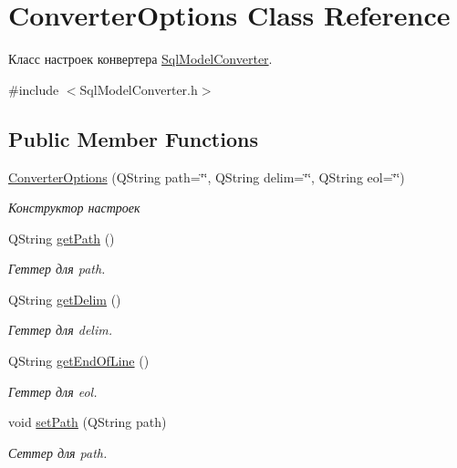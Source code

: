 \hypertarget{class_converter_options}{}\section{Converter\+Options Class Reference}
\label{class_converter_options}


Класс настроек конвертера \mbox{\hyperlink{class_sql_model_converter}{Sql\+Model\+Converter}}.  




{\ttfamily \#include $<$Sql\+Model\+Converter.\+h$>$}

\subsection*{Public Member Functions}
\begin{DoxyCompactItemize}
\item 
\mbox{\hyperlink{class_converter_options_a99308bb0a82b2f0436a7236ffe1248b0}{Converter\+Options}} (Q\+String path=\char`\"{}\char`\"{}, Q\+String delim=\char`\"{}\char`\"{}, Q\+String eol=\char`\"{}\char`\"{})
\begin{DoxyCompactList}\small\item\em Конструктор настроек \end{DoxyCompactList}\item 
Q\+String \mbox{\hyperlink{class_converter_options_a8707c21da7c05009d27812ebe3b14c05}{get\+Path}} ()
\begin{DoxyCompactList}\small\item\em Геттер для path. \end{DoxyCompactList}\item 
Q\+String \mbox{\hyperlink{class_converter_options_ae2e25968130d28b79bc5bd1ae399a343}{get\+Delim}} ()
\begin{DoxyCompactList}\small\item\em Геттер для delim. \end{DoxyCompactList}\item 
Q\+String \mbox{\hyperlink{class_converter_options_aceb1c916ae42c07a21962b8bd0796540}{get\+End\+Of\+Line}} ()
\begin{DoxyCompactList}\small\item\em Геттер для eol. \end{DoxyCompactList}\item 
void \mbox{\hyperlink{class_converter_options_ad00e2c89e88aad4e4396ec2bc662c2c8}{set\+Path}} (Q\+String path)
\begin{DoxyCompactList}\small\item\em Сеттер для path. \end{DoxyCompactList}\item 

\end{DoxyCompactItemize}
